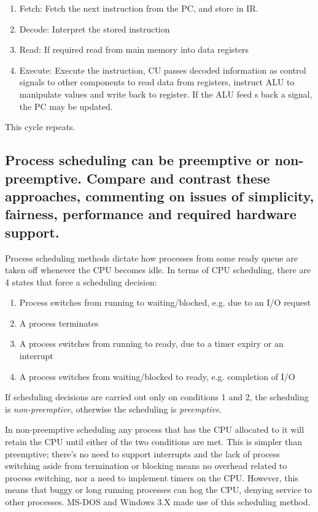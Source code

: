 \documentclass[]{article}
\begin{document}
        \begin{enumerate}
            \item Fetch: Fetch the next instruction from the PC, and store in IR.
            \item Decode: Interpret the stored instruction
            \item Read: If required read from main memory into data registers
            \item Execute: Execute the instruction, CU passes decoded information as control signals to other components to read data from registers, instruct ALU to manipulate values and write back to register. If the ALU feed s back a signal, the PC may be updated.
        \end{enumerate}
        This cycle repeats.

    \newpage
    \subsection{Process scheduling can be preemptive or non-preemptive. Compare and contrast these approaches, commenting on issues of simplicity, fairness, performance and required hardware support.}

        Process scheduling methods dictate how processes from some ready queue are taken off whenever the CPU becomes idle. In terms of CPU scheduling, there are 4 states that force a scheduling decision:

    \begin{enumerate}
        \item Process switches from running to waiting/blocked, e.g. due to an I/O request
        \item A process terminates
        \item A process switches from running to ready, due to a timer expiry or an interrupt
        \item A process switches from waiting/blocked to ready, e.g. completion of I/O
    \end{enumerate}

        If scheduling decisions are carried out only on conditions 1 and 2, the scheduling is \textit{non-preemptive}, otherwise the scheduling is \textit{preemptive}.

        In non-preemptive scheduling any process that has the CPU allocated to it will retain the CPU until either of the two conditions are met. This is simpler than preemptive; there's no need to support interrupts and the lack of process switching aside from termination or blocking means no overhead related to process switching, nor a need to implement timers on the CPU. However, this means that buggy or long running processes can hog the CPU, denying service to other processes. MS-DOS and Windows 3.X made use of this scheduling method.
\end{document}
